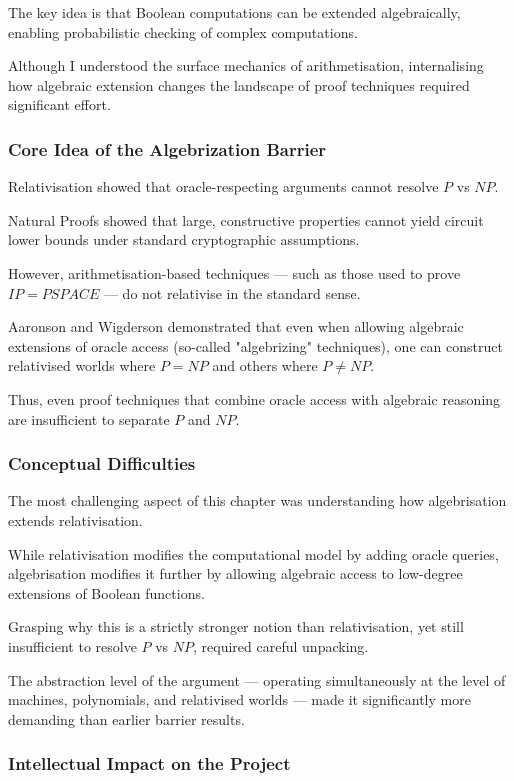 \documentclass[12pt]{article}
\begin{document}
The key idea is that Boolean computations can be extended algebraically, enabling probabilistic checking of complex computations.

Although I understood the surface mechanics of arithmetisation, internalising how algebraic extension changes the landscape of proof techniques required significant effort.

\subsubsection*{Core Idea of the Algebrization Barrier}

Relativisation showed that oracle-respecting arguments cannot resolve $P$ vs $NP$.

Natural Proofs showed that large, constructive properties cannot yield circuit lower bounds under standard cryptographic assumptions.

However, arithmetisation-based techniques --- such as those used to prove $IP = PSPACE$ --- do not relativise in the standard sense.

Aaronson and Wigderson demonstrated that even when allowing algebraic extensions of oracle access (so-called "algebrizing" techniques), one can construct relativised worlds where $P = NP$ and others where $P \neq NP$.

Thus, even proof techniques that combine oracle access with algebraic reasoning are insufficient to separate $P$ and $NP$.

\subsubsection*{Conceptual Difficulties}

The most challenging aspect of this chapter was understanding how algebrisation extends relativisation.

While relativisation modifies the computational model by adding oracle queries, algebrisation modifies it further by allowing algebraic access to low-degree extensions of Boolean functions.

Grasping why this is a strictly stronger notion than relativisation, yet still insufficient to resolve $P$ vs $NP$, required careful unpacking.

The abstraction level of the argument --- operating simultaneously at the level of machines, polynomials, and relativised worlds --- made it significantly more demanding than earlier barrier results.

\subsubsection*{Intellectual Impact on the Project}
\end{document}
